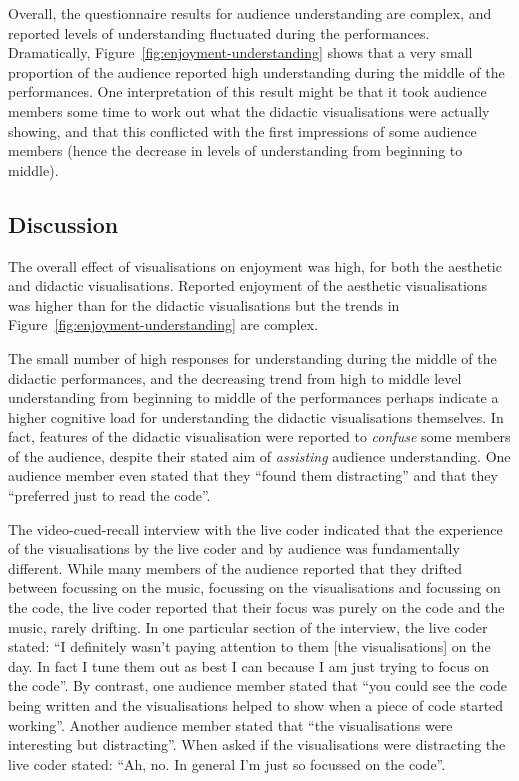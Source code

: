 \documentclass{sig-alternate}
\begin{document}
Overall, the questionnaire results for audience understanding are
complex, and reported levels of understanding fluctuated during the
performances. {\color{red} Dramatically, Figure~\ref{fig:enjoyment-understanding}
shows that a very small proportion of the audience reported high
understanding during the middle of the performances. One
interpretation of this result might be that it took audience members
some time to work out what the didactic visualisations were actually
showing, and that this conflicted with the first impressions of some
audience members (hence the decrease in levels of understanding from
beginning to middle).}

\subsection{Discussion}

The overall effect of visualisations on enjoyment was high, for both
the aesthetic and didactic visualisations. Reported enjoyment of the
aesthetic visualisations was higher than for the didactic
visualisations {\color{red} but the trends in Figure~\ref{fig:enjoyment-understanding}
are complex}.

{\color{red} The small number of high responses for understanding during the middle
of the didactic performances, and the decreasing trend from high to
middle level understanding from beginning to middle of the
performances} perhaps indicate a higher cognitive load for
understanding the didactic visualisations themselves. In fact,
features of the didactic visualisation were reported to \emph{confuse}
some members of the audience, despite their stated aim of
\emph{assisting} audience understanding. One audience member even
stated that they ``found them distracting'' and that they ``preferred
just to read the code''.

The video-cued-recall interview with the live coder indicated that the
experience of the visualisations by the live coder and by audience was
fundamentally different. While many members of the audience reported
that they drifted between focussing on the music, focussing on the
visualisations and focussing on the code, the live coder reported that
their focus was purely on the code and the music, rarely drifting. In
one particular section of the interview, the live coder stated: ``I
definitely wasn't paying attention to them [the visualisations] on the
day. In fact I tune them out as best I can because I am just trying to
focus on the code''. By contrast, one audience member stated that
``you could see the code being written and the visualisations helped
to show when a piece of code started working''. Another audience
member stated that ``the visualisations were interesting but
distracting''. When asked if the visualisations were distracting the
live coder stated: ``Ah, no. In general I'm just so focussed on the
code''.
\end{document}
